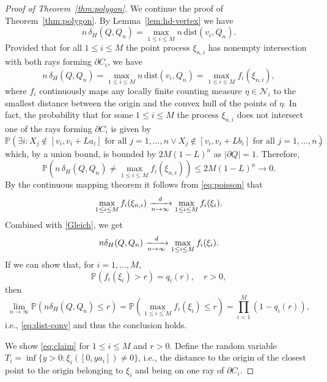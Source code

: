\documentclass[a4paper,12pt]{article}
\theoremstyle{definition}
\newcommand{\IP}{\mathbb{P}}
\newcommand{\dist}{\mathrm{dist}}
\begin{document}
\begin{proof}[Proof of Theorem~\ref{thm:polygon}]
We continue the proof of Theorem~\ref{thm:polygon}. By Lemma~\ref{lem:hd-vertex} we have
\begin{equation} \label{Gleich}
n \, \delta_H(Q,Q_n)
=\max_{1\le i \le M} n\,  \dist(v_i,Q_n).
\end{equation}
Provided that for all $1\le i\le M$ the point process $\xi_{n, i}$ has nonempty intersection with both rays forming $\partial C_i$,  we have
\[
n\,  \delta_H(Q,Q_n)
=\max_{1\le i \le M} n\,  \dist(v_i,Q_n)
=\max_{1\le i\le M}f_i(\xi_{n, i}), 
\]
where $f_i$ continuously maps any locally finite counting measure $\eta\in \mathcal{N}_i$ to the smallest distance between the origin and the convex hull of the points of $\eta$. In fact, the probability that for some $1\le i\le M$ the process $\xi_{n, i}$ does not intersect one of the rays forming $\partial C_i$ is given by
\[
\IP(\exists i\colon X_j\not\in [v_i,v_i+La_i]\text{ for all } j=1,\dots,n \lor X_j\not\in [v_i,v_i+Lb_i]\text{ for all } j=1,\dots,n), 
\]
which,  by a union bound,  is bounded by $2M (1-L)^n$ as $|\partial Q|=1$. Therefore, 
\begin{equation} \label{eq:equivalence}
\IP(n\,  \delta_H(Q,Q_n)
\neq \max_{1\le i\le M}f_i(\xi_{n, i}))
\le 2M(1-L)^n \to 0.
\end{equation}
By the continuous mapping theorem it follows from \eqref{eq:poisson} that
\[
\max_{1\le i\le M}f_i(\xi_{n,i})
\xrightarrow[n\to\infty]{\rm d}\max_{1\le i\le M}f_i(\xi_{i}).
\]
Combined with \ref{Gleich}, we get
\[
n \delta_H(Q,Q_n)\xrightarrow[n\to\infty]{\rm d}\max_{1\le i\le M}f_i(\xi_{i}).
\]
If we can show that, for $i=1,\dots,M$, 
\begin{equation} \label{eq:claim}
\IP(f_i(\xi_i)>r)=q_i(r), \quad r>0,
\end{equation}
then
\[
\lim_{n\to\infty}\IP(n \delta_H(Q,Q_n)\le r)
= \IP(\max_{1\le i\le M}f_i(\xi_{i})\le r)
=\prod_{i=1}^M (1- q_i(r)),
\]
i.e., \eqref{eq:dist-conv} and thus the conclusion holds.

We show \eqref{eq:claim} for $1\le i\le M$ and  $r>0$. Define the random variable $T_i=\inf\{y>0\colon \xi_i([0,ya_i])\neq 0\}$, i.e., the distance to the origin of the closest point to the origin belonging to $\xi_i$ and being on one ray of $\partial C_i$. 


\end{proof}
\end{document}
